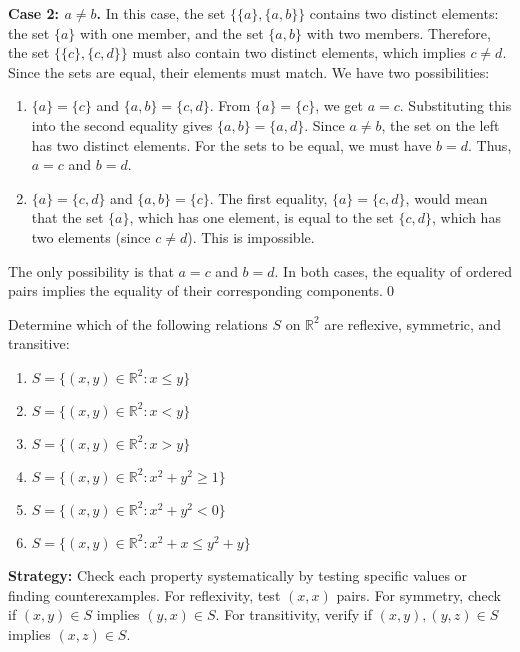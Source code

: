 \textbf{Case 2: $a \neq b$.}
In this case, the set $\{\{a\}, \{a, b\}\}$ contains two distinct elements: the set $\{a\}$ with one member, and the set $\{a, b\}$ with two members. Therefore, the set $\{\{c\}, \{c, d\}\}$ must also contain two distinct elements, which implies $c \neq d$.
Since the sets are equal, their elements must match. We have two possibilities:
\begin{enumerate}
\item $\{a\} = \{c\}$ and $\{a, b\} = \{c, d\}$.
From $\{a\} = \{c\}$, we get $a=c$. Substituting this into the second equality gives $\{a, b\} = \{a, d\}$. Since $a \neq b$, the set on the left has two distinct elements. For the sets to be equal, we must have $b=d$. Thus, $a=c$ and $b=d$.
\item $\{a\} = \{c, d\}$ and $\{a, b\} = \{c\}$.
The first equality, $\{a\} = \{c, d\}$, would mean that the set $\{a\}$, which has one element, is equal to the set $\{c, d\}$, which has two elements (since $c \neq d$). This is impossible.
\end{enumerate}
The only possibility is that $a=c$ and $b=d$. In both cases, the equality of ordered pairs implies the equality of their corresponding components.\qed



\begin{problembox}
\begin{problemstatement}
Determine which of the following relations $S$ on $\mathbb{R}^2$ are reflexive, symmetric, and transitive:
\begin{enumerate}[label=(\alph*)]
\item $S = \{(x,y) \in \mathbb{R}^2 : x \leq y\}$
\item $S = \{(x,y) \in \mathbb{R}^2 : x < y\}$
\item $S = \{(x,y) \in \mathbb{R}^2 : x > y\}$
\item $S = \{(x,y) \in \mathbb{R}^2 : x^2 + y^2 \geq 1\}$
\item $S = \{(x,y) \in \mathbb{R}^2 : x^2 + y^2 < 0\}$
\item $S = \{(x,y) \in \mathbb{R}^2 : x^2 + x \leq y^2 + y\}$
\end{enumerate}
\end{problemstatement}
\end{problembox}

\noindent\textbf{Strategy:} Check each property systematically by testing specific values or finding counterexamples. For reflexivity, test $(x,x)$ pairs. For symmetry, check if $(x,y) \in S$ implies $(y,x) \in S$. For transitivity, verify if $(x,y), (y,z) \in S$ implies $(x,z) \in S$.

